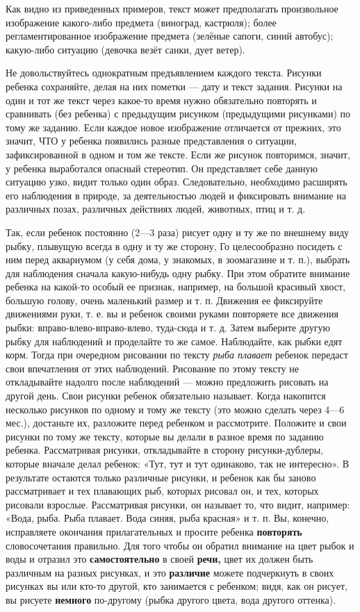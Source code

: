 \documentclass[a5paper]{book}
\renewcommand{\emph}[1]{\textit{#1}}
\begin{document}
Как видно из приведенных примеров, текст может предполагать произвольное
изображение какого-либо предмета (виноград, кастрюля); более
регламентированное изображение предмета (зелёные сапоги, синий автобус);
какую-либо ситуацию (девочка везёт санки, дует ветер).

Не довольствуйтесь однократным предъявлением каждого текста. Рисунки
ребенка сохраняйте, делая на них пометки --- дату и текст задания.
Рисунки на один и тот же текст через какое-то время нужно обязательно
повторять и сравнивать (без ребенка) с предыдущим рисунком (предыдущими
рисунками) по тому же заданию. Если каждое новое изображение отличается
от прежних, это значит, ЧТО у ребенка появились разные представления о
ситуации, зафиксированной в одном и том же тексте. Если же рисунок
повторимся, значит, у ребенка выработался опасный стереотип. Он
представляет себе данную ситуацию узко, видит только один образ.
Следовательно, необходимо расширять его наблюдения в природе, за
деятельностью людей и фиксировать внимание на различных позах, различных
действиях людей, животных, птиц и т. д.

Так, если ребенок постоянно (2---3 раза) рисует одну и ту же по внешнему
виду рыбку, плывущую всегда в одну и ту же сторону, Го целесообразно
посидеть с ним перед аквариумом (у себя дома, у знакомых, в зоомагазине
и т. п.), выбрать для наблюдения сначала какую-нибудь одну рыбку. При
этом обратите внимание ребенка на какой-то особый ее признак, например,
на большой красивый хвост, большую голову, очень маленький размер и т.
п. Движения ее фиксируйте движениями руки, т. е. вы и ребенок своими
руками повторяете все движения рыбки: вправо-влево-вправо-влево,
туда-сюда и т. д. Затем выберите другую рыбку для наблюдений и
проделайте то же самое. Наблюдайте, как рыбки едят корм. Тогда при
очередном рисовании по тексту \emph{рыба плавает} ребенок передаст свои
впечатления от этих наблюдений. Рисование по этому тексту не
откладывайте надолго после наблюдений --- можно предложить рисовать на
другой день. Свои рисунки ребенок обязательно называет. Когда накопится
несколько рисунков по одному и тому же тексту (это можно сделать через
4---6 мес.), достаньте их, разложите перед ребенком и рассмотрите.
Положите и свои рисунки по тому же тексту, которые вы делали в разное
время по заданию ребенка. Рассматривая рисунки, откладывайте в сторону
рисунки-дублеры, которые вначале делал ребенок: «Тут, тут и тут
одинаково, так не интересно». В результате остаются только различные
рисунки, и ребенок как бы заново рассматривает и тех плавающих рыб,
которых рисовал он, и тех, которых рисовали взрослые. Рассматривая
рисунки, он называет то, что видит, например: «Вода, рыба. Рыба плавает.
Вода синяя, рыба красная» и т. п. Вы, конечно, исправляете окончания
прилагательных и просите ребенка \textbf{повторять} словосочетания
правильно. Для того чтобы он обратил внимание на цвет рыбок и воды и
отразил это \textbf{самостоятельно} в своей \textbf{речи,} цвет их
должен быть различным на разных рисунках, и это \textbf{различие} можете
подчеркнуть в своих рисунках вы или кто-то другой, кто занимается с
ребенком; видя, как он рисует, вы рисуете \textbf{немного} по-другому
(рыбка другого цвета, вода другого оттенка).
\end{document}
